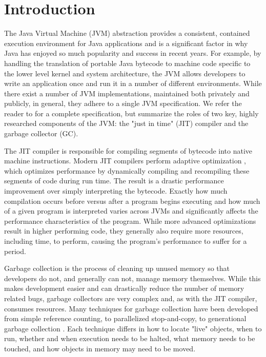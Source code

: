 \documentclass{sig-alternate}
\begin{document}



\section{Introduction}

The Java Virtual Machine (JVM) abstraction provides a consistent, contained execution environment for Java applications and is a significant factor in why Java has enjoyed so much popularity and success in recent years. For example, by handling the translation of portable Java bytecode to machine code specific to the lower level kernel and system architecture, the JVM allows developers to write an application once and run it in a number of different environments. While there exist a number of JVM implementations, maintained both privately and publicly, in general, they adhere to a single JVM specification. We refer the reader to \cite{lindholm2014java} for a complete specification, but summarize the roles of two key, highly researched components of the JVM: the "just in time" (JIT) compiler and the garbage collector (GC).

The JIT compiler is responsible for compiling segments of bytecode into native machine instructions. Modern JIT compilers perform adaptive optimization \cite{suganuma2001dynamic}, which optimizes performance by dynamically compiling and recompiling these segments of code during run time. The result is a drastic performance improvement over simply interpreting the bytecode. Exactly how much compilation occurs before versus after a program begins executing and how much of a given program is interpreted varies across JVMs and significantly affects the performance characteristics of the program. While more advanced optimizations result in higher performing code, they generally also require more resources, including time, to perform, causing the program's performance to suffer for a period.

Garbage collection is the process of cleaning up unused memory so that developers do not, and generally can not, manage memory themselves. While this makes development easier and can drastically reduce the number of memory related bugs, garbage collectors are very complex and, as with the JIT compiler, consumes resources. Many techniques for garbage collection have been developed from simple reference counting, to parallelized stop-and-copy, to generational garbage collection \cite{lins1996garbage}. Each technique differs in how to locate "live" objects, when to run, whether and when execution needs to be halted, what memory needs to be touched, and how objects in memory may need to be moved.
\end{document}
